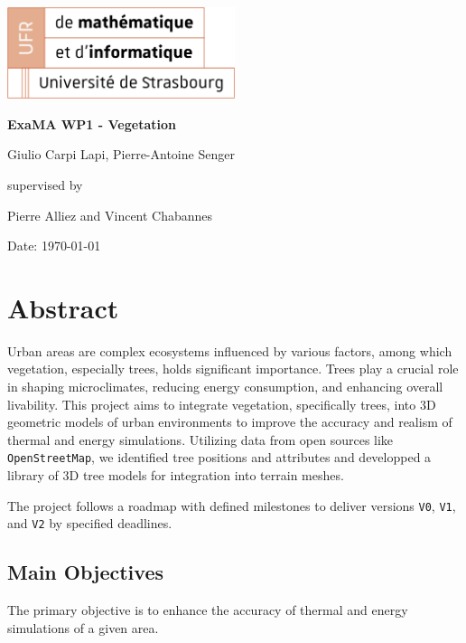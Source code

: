 \documentclass[12pt]{article}
\begin{document}
\begin{titlepage}
\centering
\includegraphics[width=0.5\textwidth]{images/logo_ufr.png}\par\vspace{1cm}
\vspace{1.5cm}
{\huge\bfseries ExaMA WP1 - Vegetation\par}
\vspace{2cm}
{\Large Giulio Carpi Lapi, Pierre-Antoine Senger\par}
\vfill
supervised by\par
Pierre Alliez and Vincent Chabannes

\vfill

{\large Date: \today\par}
\end{titlepage}

\tableofcontents
\newpage

\section{Abstract}
Urban areas are complex ecosystems influenced by various factors, among which 
vegetation, especially trees, holds significant importance. Trees play a crucial 
role in shaping microclimates, reducing energy consumption, and enhancing overall 
livability\cite{TIR4sTREEt}. This project aims to integrate vegetation, specifically trees, into 3D 
geometric models of urban environments to improve the accuracy and realism of thermal 
and energy simulations. Utilizing data from open sources like \texttt{OpenStreetMap},
we identified tree positions and attributes and developped a library of 3D tree
models for integration into terrain meshes.

The project follows a roadmap with defined milestones to deliver versions
\texttt{V0}, \texttt{V1}, and \texttt{V2} by specified  deadlines.

\subsection{Main Objectives}

The primary objective is to enhance the accuracy of thermal and energy
simulations of a given area.
\end{document}
